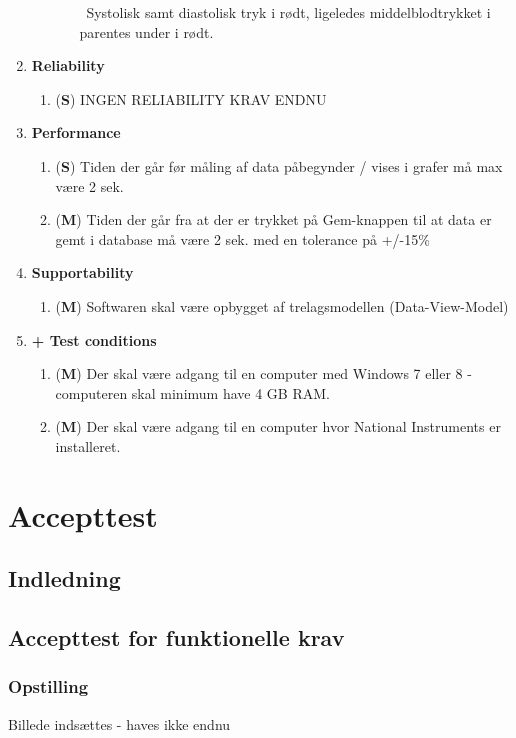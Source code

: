 \begin{enumerate}
\begin{enumerate}
\begin{itemize}
\ Systolisk samt diastolisk tryk i rødt, ligeledes middelblodtrykket i parentes under i rødt.
\end{itemize}
\end{enumerate}
\item \textbf{Reliability}
\begin{enumerate}
\item (\textbf{S}) INGEN RELIABILITY KRAV ENDNU
\end{enumerate}
\item \textbf{Performance}
\begin{enumerate}
\item (\textbf{S}) Tiden der går før måling af data påbegynder / vises i grafer må max være 2 sek.
\item (\textbf{M}) Tiden der går fra at der er trykket på Gem-knappen til at data er gemt i database må være 2 sek. med en tolerance på +/-15\%  
\end{enumerate}
\item \textbf{Supportability}
\begin{enumerate}
\item (\textbf{M}) Softwaren skal være opbygget af trelagsmodellen (Data-View-Model)
\end{enumerate}
\item \textbf{+ Test conditions}
\begin{enumerate}
\item (\textbf{M}) Der skal være adgang til en computer med Windows 7 eller 8 - computeren skal minimum have 4 GB RAM.
\item (\textbf{M}) Der skal være adgang til en computer hvor National Instruments er installeret.
\end{enumerate}
\end{enumerate}

\chapter{Accepttest}
\section{Indledning}
\section{Accepttest for funktionelle krav}

\subsection{Opstilling}
Billede indsættes - haves ikke endnu

